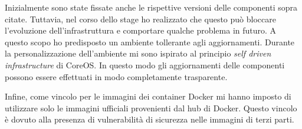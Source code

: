 Inizialmente sono state fissate anche le rispettive versioni delle componenti 
sopra citate. Tuttavia, nel corso dello stage ho realizzato che questo può 
bloccare l'evoluzione dell'infrastruttura e comportare qualche problema in 
futuro. A questo scopo ho predisposto un ambiente tollerante agli 
aggiornamenti. Durante la personalizzazione dell'ambiente mi sono ispirato al 
principio  \textit{self driven infrastructure} di CoreOS. 
In questo modo gli aggiornamenti delle componenti possono essere effettuati in 
modo completamente trasparente.

Infine, come vincolo per le immagini dei container Docker mi hanno imposto di 
utilizzare solo le immagini ufficiali provenienti dal hub di Docker. Questo 
vincolo è dovuto alla presenza di vulnerabilità di sicurezza nelle immagini di 
terzi parti.